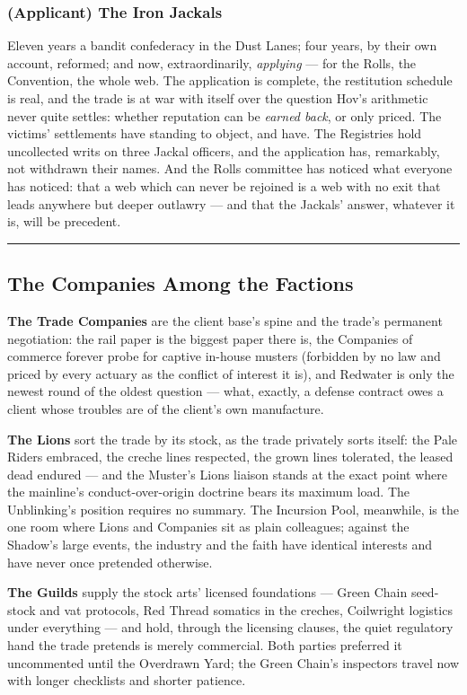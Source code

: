 \subsubsection{(Applicant) The Iron Jackals}

Eleven years a bandit confederacy in the Dust Lanes; four years, by their own account, reformed; and now, extraordinarily, \textit{applying} --- for the Rolls, the Convention, the whole web. The application is complete, the restitution schedule is real, and the trade is at war with itself over the question Hov's arithmetic never quite settles: whether reputation can be \textit{earned back}, or only priced. The victims' settlements have standing to object, and have. The Registries hold uncollected writs on three Jackal officers, and the application has, remarkably, not withdrawn their names. And the Rolls committee has noticed what everyone has noticed: that a web which can never be rejoined is a web with no exit that leads anywhere but deeper outlawry --- and that the Jackals' answer, whatever it is, will be precedent.

\medskip\hrule\medskip

\subsection{The Companies Among the Factions}

\textbf{The Trade Companies} are the client base's spine and the trade's permanent negotiation: the rail paper is the biggest paper there is, the Companies of commerce forever probe for captive in-house musters (forbidden by no law and priced by every actuary as the conflict of interest it is), and Redwater is only the newest round of the oldest question --- what, exactly, a defense contract owes a client whose troubles are of the client's own manufacture.

\textbf{The Lions} sort the trade by its stock, as the trade privately sorts itself: the Pale Riders embraced, the creche lines respected, the grown lines tolerated, the leased dead endured --- and the Muster's Lions liaison stands at the exact point where the mainline's conduct-over-origin doctrine bears its maximum load. The Unblinking's position requires no summary. The Incursion Pool, meanwhile, is the one room where Lions and Companies sit as plain colleagues; against the Shadow's large events, the industry and the faith have identical interests and have never once pretended otherwise.

\textbf{The Guilds} supply the stock arts' licensed foundations --- Green Chain seed-stock and vat protocols, Red Thread somatics in the creches, Coilwright logistics under everything --- and hold, through the licensing clauses, the quiet regulatory hand the trade pretends is merely commercial. Both parties preferred it uncommented until the Overdrawn Yard; the Green Chain's inspectors travel now with longer checklists and shorter patience.

